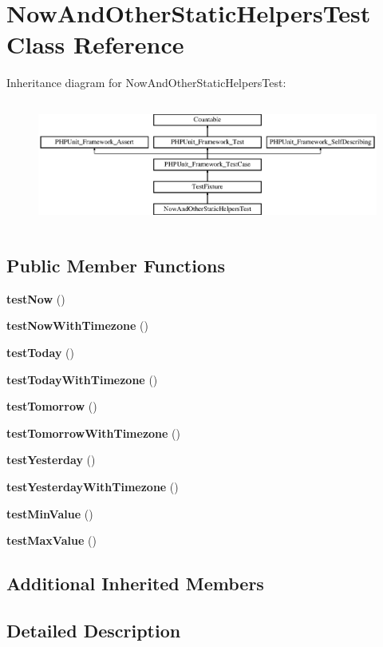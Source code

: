 \section{Now\+And\+Other\+Static\+Helpers\+Test Class Reference}
\label{class_now_and_other_static_helpers_test}
Inheritance diagram for Now\+And\+Other\+Static\+Helpers\+Test\+:\begin{figure}[H]
\begin{center}
\leavevmode
\includegraphics[height=4.129793cm]{class_now_and_other_static_helpers_test}
\end{center}
\end{figure}
\subsection*{Public Member Functions}
\begin{DoxyCompactItemize}
\item 
{\bf test\+Now} ()
\item 
{\bf test\+Now\+With\+Timezone} ()
\item 
{\bf test\+Today} ()
\item 
{\bf test\+Today\+With\+Timezone} ()
\item 
{\bf test\+Tomorrow} ()
\item 
{\bf test\+Tomorrow\+With\+Timezone} ()
\item 
{\bf test\+Yesterday} ()
\item 
{\bf test\+Yesterday\+With\+Timezone} ()
\item 
{\bf test\+Min\+Value} ()
\item 
{\bf test\+Max\+Value} ()
\end{DoxyCompactItemize}
\subsection*{Additional Inherited Members}


\subsection{Detailed Description}


